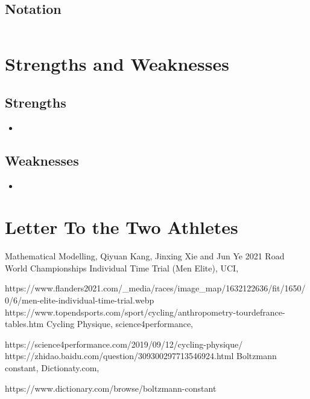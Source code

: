 \documentclass{article}
\begin{document}
	\subsection{Notation}
	\begin{tabular}{|l|l|l|}
		\hline
	\end{tabular}
	\section{Strengths and Weaknesses}
	\subsection*{Strengths}
	\begin{itemize}
		\item
	\end{itemize}
	\subsection*{Weaknesses}

	\begin{itemize}
		\item
	\end{itemize}
	\newpage
	\section{Letter To the Two Athletes}
	\newpage
	\thispagestyle{empty}
	\renewcommand\refname{References}
	\clearpage
	\begin{thebibliography}{100}
		 Mathematical Modelling, Qiyuan Kang, Jinxing Xie and Jun Ye
		2021 Road World Championships Individual Time Trial (Men Elite), UCI,

		https://www.flanders2021.com/\_media/races/image\_map/1632122636/fit/1650/0/6/men-elite-individual-time-trial.webp
		https://www.topendsports.com/sport/cycling/anthropometry-tourdefrance-tables.htm
		Cycling Physique, science4performance,

		https://science4performance.com/2019/09/12/cycling-physique/
		https://zhidao.baidu.com/question/309300297713546924.html
		Boltzmann constant, Dictionaty.com,

		https://www.dictionary.com/browse/boltzmann-constant
	\end{thebibliography}
\end{document}
